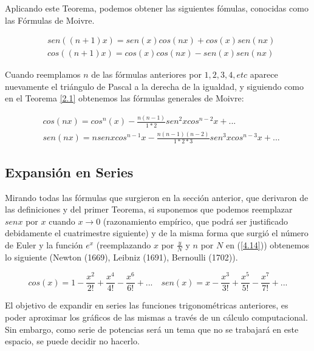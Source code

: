 \documentclass[a4paper,10pt,BCOR10mm,oneside,headsepline]{scrbook}
\begin{document}
Aplicando este Teorema, podemos obtener las siguientes fómulas, conocidas como las Fórmulas de Moivre.

\begin{equation}\begin{split} \label{4.12 y 4.13}
& sen((n+1)x)=sen(x)cos(nx)+cos(x)sen(nx) \\
& cos((n+1)x)=cos(x)cos(nx)-sen(x)sen(nx)
\end{split}
\end{equation} 

Cuando reemplamos $n$ de las fórmulas anteriores por $1,2,3,4,etc$ aparece nuevamente el triángulo de Pascal a la derecha de la igualdad, y siguiendo como en el Teorema \ref{2.1} obtenemos las fórmulas generales de Moivre:

\begin{equation}\begin{split} \label{4.14}
& cos(nx)=cos^n(x)-\frac{n(n-1)}{1*2}sen^2x cos^{n-2}x+... \\
& sen(nx)=n senx cos^{n-1}x-\frac{n(n-1)(n-2)}{1*2*3}sen^3xcos^{n-3}x+...
\end{split}
\end{equation}

\subsection{Expansión en Series}

Mirando todas las fórmulas que surgieron en la sección anterior, que derivaron de las definiciones y del primer Teorema, si suponemos que podemos reemplazar $senx$ por $x$ cuando $x\rightarrow 0$ (razonamiento empírico, que podrá ser justificado debidamente el cuatrimestre siguiente) y de la misma forma que surgió el número de Euler y la función $e^x$ (reemplazando $x$ por $\frac{y}{N}$ y $n$ por $N$ en (\ref{4.14})) obtenemos lo siguiente (Newton (1669), Leibniz (1691), Bernoulli (1702)). 

 \begin{equation}\label{4.16 y 4.17}
cos(x)=1-\frac{x^2}{2!}+\frac{x^4}{4!}-\frac{x^6}{6!}+... \quad
sen(x)=x-\frac{x^3}{3!}+\frac{x^5}{5!}-\frac{x^7}{7!}+...
\end{equation} 

El objetivo de expandir en series las funciones trigonométricas anteriores, es poder aproximar los gráficos de las mismas a través de un cálculo computacional. Sin embargo, como serie de potencias será un tema que no se trabajará en este espacio, se puede decidir no hacerlo.
\end{document}
